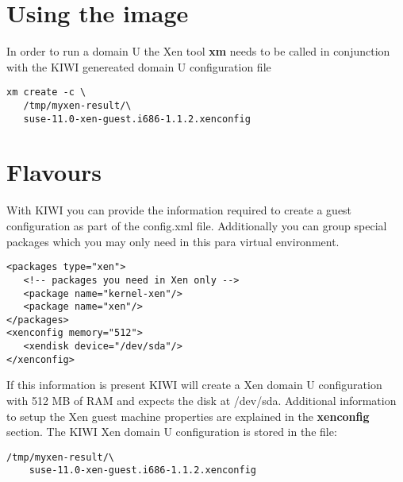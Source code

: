 \section{Using the image}

In order to run a domain U the Xen tool \textbf{xm} needs to be called
in conjunction with the KIWI genereated domain U configuration file

\begin{Command}{13cm}
\begin{verbatim}
xm create -c \
   /tmp/myxen-result/\
   suse-11.0-xen-guest.i686-1.1.2.xenconfig
\end{verbatim}
\end{Command}

\section{Flavours}

With KIWI you can provide the information
required to create a guest configuration as part of the config.xml
file. Additionally you can group special packages which you may only
need in this para virtual environment.

\begin{Command}{13cm}
\begin{verbatim}
<packages type="xen">
   <!-- packages you need in Xen only -->
   <package name="kernel-xen"/>
   <package name="xen"/>
</packages>
<xenconfig memory="512">
   <xendisk device="/dev/sda"/>
</xenconfig>
\end{verbatim}
\end{Command}

If this information is present KIWI will create a Xen domain U
configuration with 512 MB of RAM and expects the disk at /dev/sda.
Additional information to setup the Xen guest machine properties are
explained in the \textbf{xenconfig} section. The KIWI Xen domain U
configuration is stored in the file:

\begin{Command}{13cm}
\begin{verbatim}
/tmp/myxen-result/\
    suse-11.0-xen-guest.i686-1.1.2.xenconfig
\end{verbatim}
\end{Command}
